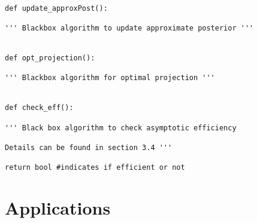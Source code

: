 \begin{lstlisting}
																																																																																																																																																																															     def update_approxPost():
																																																																																																																																																																																         ''' Blackbox algorithm to update approximate posterior '''
																																																																																																																																																																																		     
																																																																																																																																																																																			     def opt_projection(): 
																																																																																																																																																																																				         ''' Blackbox algorithm for optimal projection '''
																																																																																																																																																																																						         
																																																																																																																																																																																								     def check_eff(): 
																																																																																																																																																																																									         ''' Black box algorithm to check asymptotic efficiency
																																																																																																																																																																																											             Details can be found in section 3.4 '''
																																																																																																																																																																																														             return bool #indicates if efficient or not
																																																																																																																																																																																																	 \end{lstlisting}

																																																																																																																																																																																																	 \section{Applications}

